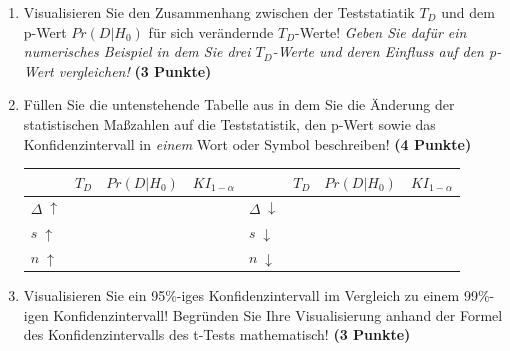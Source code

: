 \documentclass[a4paper, 9pt]{scrartcl}\usepackage[]{graphicx}\usepackage[]{xcolor}
\begin{document}
\begin{enumerate}
\item Visualisieren Sie den Zusammenhang zwischen der Teststatiatik
  $T_{D}$ und dem p-Wert $Pr(D|H_0)$ f{\"u}r sich ver{\"a}ndernde $T_{D}$-Werte!
  \textit{Geben Sie daf{\"u}r ein numerisches Beispiel in dem Sie drei
    $T_{D}$-Werte und deren Einfluss auf den p-Wert vergleichen!}
  \textbf{(3 Punkte)}  
\item  F{\"u}llen Sie die untenstehende Tabelle aus in dem Sie die {\"A}nderung der
  statistischen Ma{\ss}zahlen auf die Teststatistik, den p-Wert sowie das
  Konfidenzintervall in \textit{einem} Wort oder Symbol beschreiben! \textbf{(4 Punkte)}
\begin{center}
  \large
  \begin{tabular}[c]{l|c|c|c|l|c|c|c}
    & $T_{D}$ & $Pr(D|H_0)$ & $KI_{1-\alpha}$ & & $T_{D}$ & $Pr(D|H_0)$ & $KI_{1-\alpha}$\strut\\ 
    \hline
    \textbf{$\Delta\; \uparrow$} & \hspace{1.8cm} & \hspace{1.8cm}  & \hspace{1.8cm} & \textbf{
                                                          $\Delta\; \downarrow$} &
                                                                          \hspace{1.8cm} & \hspace{1.8cm}  & \hspace{1.8cm}\strut\\
    \hline
        \textbf{$s\; \uparrow$} & \hspace{1.8cm} & \hspace{1.8cm}  & \hspace{1.8cm} & \textbf{
                                                          $s\; \downarrow$} &
                                                                          \hspace{1.8cm}
                                                & \hspace{1.8cm}  & \hspace{1.8cm}\strut\\
    \hline
        \textbf{$n\; \uparrow$} & \hspace{1.8cm} & \hspace{1.8cm}  & \hspace{1.8cm} & \textbf{
                                                          $n\; \downarrow$} &
                                                                          \hspace{1.8cm}
                                                & \hspace{1.8cm}  & \hspace{1.8cm}\strut\\
    \hline
  \end{tabular}
\end{center}
\item Visualisieren Sie ein 95\%-iges Konfidenzintervall im Vergleich
  zu einem 99\%-igen Konfidenzintervall! Begr{\"u}nden Sie Ihre Visualisierung anhand der Formel
  des Konfidenzintervalls des t-Tests mathematisch! \textbf{(3 Punkte)} 
\end{enumerate} 
\end{document}
